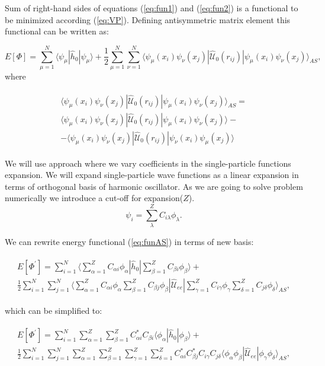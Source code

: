\documentclass[10pt]{article}
\newcommand*{\hatU}{\hat{\mathcal{U}}}
\begin{document}
Sum of right-hand sides of equations (\ref{eq:fun1}) and (\ref{eq:fun2}) is a functional to be minimized according (\ref{eq:VP}).
Defining antisymmetric matrix element this functional can be written as:

\begin{equation}
E[\Phi] = \sum_{\mu=1}^N \langle \psi_{\mu} | \hat{h}_0 | \psi_{\mu} \rangle + \frac{1}{2}\sum_{\mu=1}^N\sum_{\nu=1}^N\langle \psi_{\mu}(x_i)\psi_{\nu}(x_j)|\hatU_{0}(r_{ij})|\psi_{\mu}(x_i)\psi_{\nu}(x_j)\rangle_{AS},
\label{eq:funAS}
\end{equation}
where

\begin{align}
\begin{split}
\langle \psi_{\mu}(x_i)\psi_{\nu}(x_j)|\hatU_{0}(r_{ij})|\psi_{\mu}(x_i)\psi_{\nu}(x_j)\rangle_{AS} = \\
\langle \psi_{\mu}(x_i)\psi_{\nu}(x_j)|\hatU_{0}(r_{ij})|\psi_{\mu}(x_i)\psi_{\nu}(x_j)\rangle - \\
- \langle \psi_{\mu}(x_i)\psi_{\nu}(x_j)|\hatU_{0}(r_{ij})|\psi_{\nu}(x_i)\psi_{\mu}(x_j)\rangle
\end{split}
\end{align}


We will use approach where we vary coefficients in the single-particle functions expansion.  We will expand single-particle wave functions as a linear expansion in terms
of orthogonal basis of harmonic oscillator. As we are going to solve problem numerically we introduce a cut-off for expansion($Z$).
\[
\psi_i  = \sum_{\lambda}^Z C_{i\lambda}\phi_{\lambda}. \label{eq:newbasis}
\]

We can rewrite energy functional (\ref{eq:funAS}) in terms of new basis:

\begin{align}
\begin{split}
E[\Phi^{\prime}] = \sum_{i=1}^N \langle \sum_{\alpha=1}^Z C_{\alpha i}\phi_{\alpha} | \hat{h}_0 | \sum_{\beta=1}^Z C_{\beta i}\phi_{\beta} \rangle + \\
\frac{1}{2}\sum_{i=1}^N\sum_{j=1}^N \langle \sum_{\alpha=1}^Z C_{\alpha i}\phi_{\alpha} \sum_{\beta=1}^Z C_{\beta j}\phi_{\beta} |\hatU_{ee}|
\sum_{\gamma=1}^Z C_{i \gamma}\phi_{\gamma} \sum_{\delta=1}^Z C_{j \delta}\phi_{\delta} \rangle _{AS},
\label{eq:newbasisintro}
\end{split}
\end{align}

which can be simplified to:

\begin{align}
\begin{split}
E[\Phi^{\prime}] = \sum_{i=1}^N \sum_{\alpha=1}^Z \sum_{\beta=1}^Z C_{\alpha i}^*  C_{\beta i} \langle \phi_{\alpha} | \hat{h}_0 | \phi_{\beta} \rangle + \\
\frac{1}{2}\sum_{i=1}^N\sum_{j=1}^N  \sum_{\alpha=1}^Z \sum_{\beta=1}^Z \sum_{\gamma=1}^Z \sum_{\delta=1}^Z C_{\alpha i}^*  C_{\beta j}^* C_{i \gamma} C_{j \delta} \langle \phi_{\alpha} \phi_{\beta} |\hatU_{ee}|
 \phi_{\gamma}  \phi_{\delta} \rangle _{AS},
\label{eq:newbasisgood}
\end{split}
\end{align}
\end{document}
